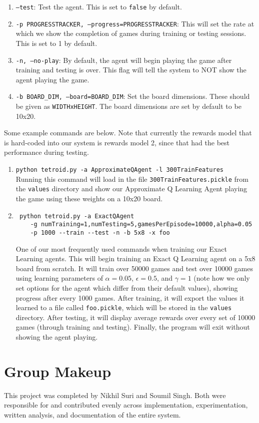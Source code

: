 \documentclass[10pt]{article}
\begin{document}
\begin{enumerate}
    \item \texttt{--test}: Test the agent. This is set to \texttt{false} by default.
    \item \texttt{-p PROGRESSTRACKER, --progress=PROGRESSTRACKER}: This will set the rate at which we show the completion of games during training or testing sessions. This is set to 1 by default.
    \item \texttt{-n, --no-play}: By default, the agent will begin playing the game after training and testing is over. This flag will tell the system to NOT show the agent playing the game.
    \item \texttt{-b BOARD\_DIM, --board=BOARD\_DIM}: Set the board dimensions. These should be given as \texttt{WIDTHxHEIGHT}. The board dimensions are set by default to be 10x20.
\end{enumerate}
Some example commands are below. Note that currently the rewards model  that is hard-coded into our system is rewards model 2, since that had the best performance during testing.
\begin{enumerate}
    \item \texttt{python tetroid.py -a ApproximateQAgent -l 300TrainFeatures}\\ Running this command will load in the file \texttt{300TrainFeatures.pickle} from the \texttt{values} directory and show our Approximate Q Learning Agent playing the game using these weights on a 10x20 board.
    \item \begin{verbatim} python tetroid.py -a ExactQAgent
    -g numTraining=1,numTesting=5,gamesPerEpisode=10000,alpha=0.05
    -p 1000 --train --test -n -b 5x8 -x foo
    \end{verbatim}
    One of our most frequently used commands when training our Exact Learning agents. This will begin training an Exact Q Learning agent on a 5x8 board from scratch. It will train over 50000 games and test over 10000 games using learning parameters of $\alpha=0.05$, $\epsilon=0.5$, and $\gamma=1$ (note how we only set options for the agent which differ from their default values), showing progress after every 1000 games. After training, it will export the values it learned to a file called \texttt{foo.pickle}, which will be stored in the \texttt{values} directory. After testing, it will display average rewards over every set of 10000 games (through training and testing). Finally, the program will exit without showing the agent playing.
\end{enumerate}

\section{Group Makeup}
This project was completed by Nikhil Suri and Soumil Singh. Both were responsible for and contributed evenly across implementation, experimentation, written analysis, and documentation of the entire system.



\end{document}

